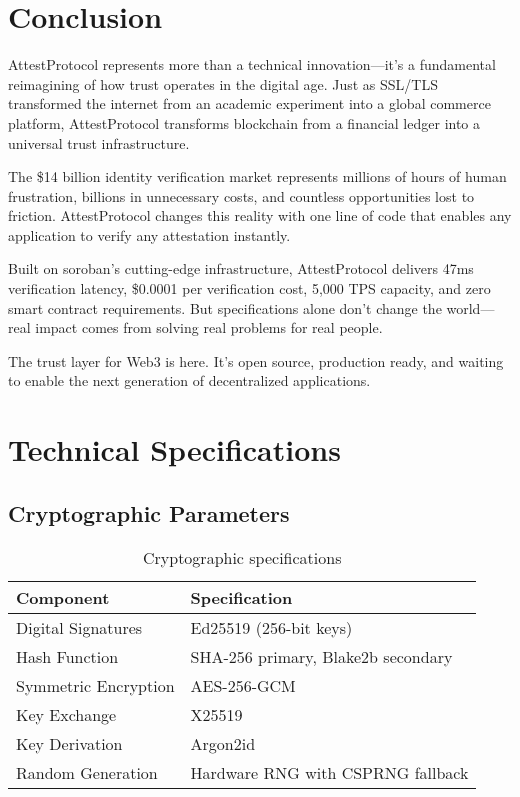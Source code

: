 \documentclass[11pt,a4paper]{article}
\begin{document}
\section{Conclusion}\label{sec:conclusion}

AttestProtocol represents more than a technical innovation---it's a fundamental reimagining of how trust operates in the digital age. Just as SSL/TLS transformed the internet from an academic experiment into a global commerce platform, AttestProtocol transforms blockchain from a financial ledger into a universal trust infrastructure.

The \$14 billion identity verification market represents millions of hours of human frustration, billions in unnecessary costs, and countless opportunities lost to friction. AttestProtocol changes this reality with one line of code that enables any application to verify any attestation instantly.

Built on \gls{soroban}'s cutting-edge infrastructure, AttestProtocol delivers 47ms verification latency, \$0.0001 per verification cost, 5,000 TPS capacity, and zero smart contract requirements. But specifications alone don't change the world---real impact comes from solving real problems for real people.

The trust layer for Web3 is here. It's open source, production ready, and waiting to enable the next generation of decentralized applications.

\newpage
\printglossary[title={Glossary of Terms}]

\newpage
\printindex

\newpage
\appendix

\section{Technical Specifications}\label{app:specs}

\subsection{Cryptographic Parameters}

\begin{table}[H]
\centering
\caption{Cryptographic specifications}
\begin{tabular}{@{}ll@{}}
\toprule
\textbf{Component} & \textbf{Specification} \\
\midrule
Digital Signatures & Ed25519 (256-bit keys) \\
Hash Function & SHA-256 primary, Blake2b secondary \\
Symmetric Encryption & AES-256-GCM \\
Key Exchange & X25519 \\
Key Derivation & Argon2id \\
Random Generation & Hardware RNG with CSPRNG fallback \\
\bottomrule
\end{tabular}
\end{table}
\end{document}
